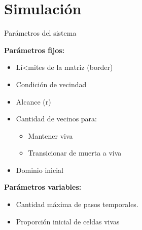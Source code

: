 \section{Simulación}

\begin{frame}{Parámetros del sistema}
    \begin{minipage}[t]{0.45\linewidth}

        {\textbf{Parámetros fijos:}
        \begin{itemize}
            \item Lí<mites de la matriz (border)
            \item Condición de vecindad
            \item Alcance (r)
            \item Cantidad de vecinos para:
            \begin{itemize}
                \item Mantener viva
                \item Transicionar de muerta a viva
            \end{itemize}
            \item Dominio inicial
        \end{itemize}}
    \end{minipage}
    \begin{minipage}[t]{0.45\linewidth}
        \textbf{Parámetros variables:}
        \begin{itemize}
            \item Cantidad máxima de pasos temporales.
            \item Proporción inicial de celdas vivas
        \end{itemize}

    \end{minipage}
\end{frame}

